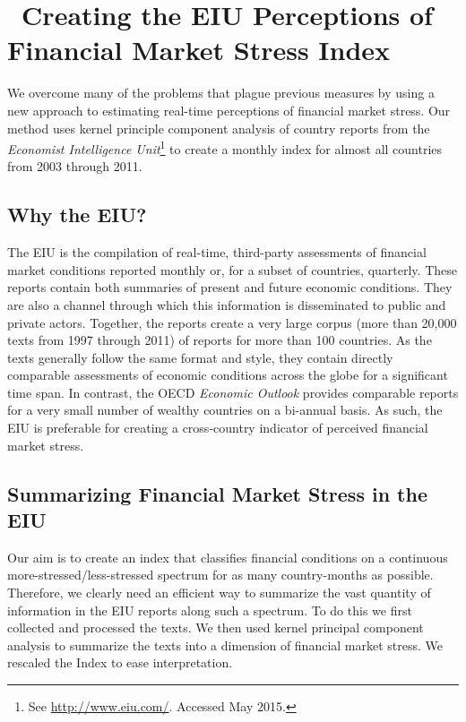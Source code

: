 \documentclass[]{article}
\begin{document}
\section{~Creating the EIU Perceptions of Financial Market Stress
Index}\label{creating-the-perceptions-of-financial-market-stress-index}

We overcome many of the problems that plague previous measures by using a new approach to estimating real-time perceptions of financial market stress. Our method uses kernel principle component analysis \citep{Scholkopf1998,lodhi2002,Spirling2012} of country reports from the \emph{Economist Intelligence Unit}\footnote{See \url{http://www.eiu.com/}. Accessed May 2015.} to create a monthly index for almost all countries from 2003 through 2011.

\subsection{Why the EIU?}\label{why-the-eiu}

The EIU is the compilation of real-time, third-party
assessments of financial market conditions reported monthly or, for a subset of countries, quarterly. These reports contain both summaries of
present and future economic conditions. They are also a channel through which this information is disseminated to public and private actors. Together, the reports create a very large corpus
(more than 20,000 texts from 1997 through 2011) of
reports for more than 100 countries. As the texts generally follow the
same format and style, they contain directly comparable assessments of
economic conditions across the globe for a significant time
span. In contrast, the OECD \emph{Economic Outlook} provides comparable
reports for a very small number of wealthy countries on a bi-annual
basis. As such, the EIU is preferable for creating a cross-country indicator of perceived financial market stress.

\subsection{Summarizing Financial Market Stress in the
EIU}\label{summarizing-financial-market-stress-in-the-eiu}

Our aim is to create an index that classifies financial conditions on a
continuous more-stressed/less-stressed spectrum for as many country-months as possible. Therefore, we clearly need an efficient way to summarize the vast quantity of information in the EIU reports along such a spectrum. To do this we first collected and processed the texts. We then used kernel principal component analysis to summarize the texts into a
dimension of financial market stress. We rescaled the Index to ease
interpretation.
\end{document}
